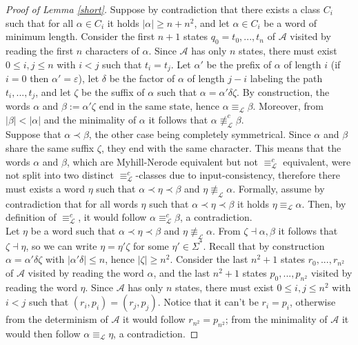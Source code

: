 \documentclass[runningheads]{llncs}
\begin{document}
\vskip5mm

\begin{proof}[\noindent Proof of Lemma \ref{short}]
Suppose by contradiction that there exists a class $C_i$ such that for all $\alpha \in C_i$ it holds $|\alpha| \ge n + n^2$, and let $\alpha \in C_i$ be a word of minimum length. Consider the first $n+1$ states $q_0=t_0, ..., t_n$ of $\mathcal A$ visited by reading the first $n$ characters of $\alpha$. Since $\mathcal A$ has only $n$ states, there must exist $0 \le i,j \le n$ with $i < j$ such that $t_i=t_j$. Let $\alpha'$ be the prefix of $\alpha$ of length $i$ (if $i=0$ then $\alpha' = \varepsilon$), let $\delta$ be the factor of $\alpha$ of length $j-i$ labeling the path $t_i,...,t_j$, and let $\zeta$ be the suffix of $\alpha$ such that $\alpha = \alpha' \delta \zeta$. By construction, the words $\alpha$ and $\beta := \alpha' \zeta$ end in the same state, hence $\alpha \equiv_\mathcal L \beta$. Moreover, from $|\beta| < |\alpha|$ and the minimality of $\alpha$ it follows that $\alpha \not\equiv_\mathcal L^c \beta$. 
\\Suppose that $\alpha \prec \beta$, the other case being completely symmetrical. Since $\alpha$ and $\beta$ share the same suffix $\zeta$, they end with the same character. This means that the words $\alpha$ and $\beta$, which are Myhill-Nerode equivalent but not $\equiv_\mathcal L^c$ equivalent, were not split into two distinct $\equiv_\mathcal L^c$-classes due to input-consistency, therefore there must exists a word $\eta$ such that $\alpha \prec \eta \prec \beta$ and $\eta \not\equiv_\mathcal L \alpha$. Formally, assume by contradiction that for all words $\eta$ such that $\alpha \prec \eta \prec \beta$ it holds $\eta \equiv_\mathcal L \alpha$. Then, by definition of $\equiv_\mathcal L^c$, it would follow $\alpha \equiv_\mathcal L^c \beta$, a contradiction.
\\Let $\eta$ be a word such that $\alpha \prec \eta \prec \beta$ and $\eta \not\equiv_\mathcal L \alpha$. From $\zeta \dashv \alpha, \beta$ it follows that $\zeta \dashv \eta$, so we can write $\eta = \eta' \zeta$ for some $\eta' \in \Sigma^*$. Recall that by construction $\alpha = \alpha' \delta \zeta$ with $|\alpha' \delta| \le n$, hence $|\zeta| \ge n^2$. Consider the last $n^2+1$ states $r_0, ..., r_{n^2}$ of $\mathcal A$ visited by reading the word $\alpha$, and the last $n^2+1$ states $p_0, ..., p_{n^2}$ visited by reading the word $\eta$. Since $\mathcal A$ has only $n$ states, there must exist $0 \le i,j \le n^2$ with $i < j$ such that $(r_i, p_i) = (r_j, p_j)$. Notice that it can't be $r_i = p_i$, otherwise from the determinism of $\mathcal A$ it would follow $r_{n^2} = p_{n^2}$; from the minimality of $\mathcal A$ it would then follow $\alpha \equiv_\mathcal L \eta$, a contradiction.

\end{proof}
\end{document}

